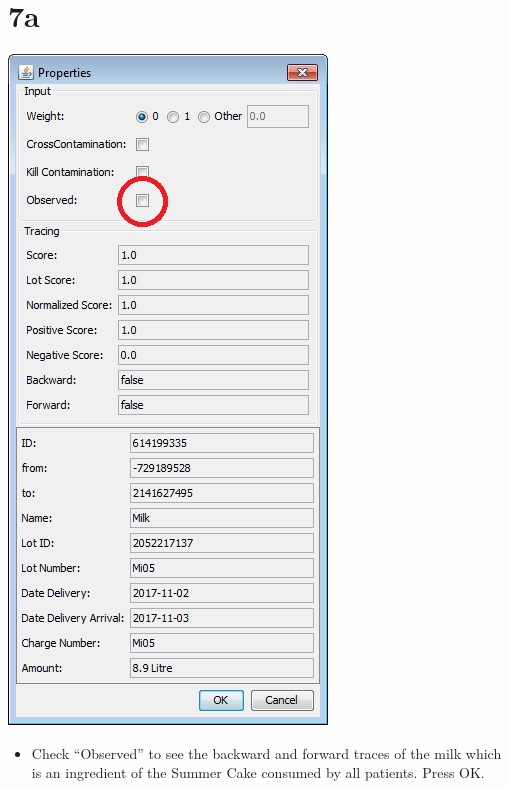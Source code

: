 \documentclass[10pt]{beamer}
\begin{document}
\section{7a}
\begin{frame}
	\begin{center}
			\includegraphics[height=0.6\textheight]{7a.png}
	\end{center}
	\begin{itemize}
		\item Check “Observed” to see the backward and forward traces of the milk which is an ingredient of the Summer Cake consumed by all patients. Press OK.
	\end{itemize}
\end{frame}
\end{document}
